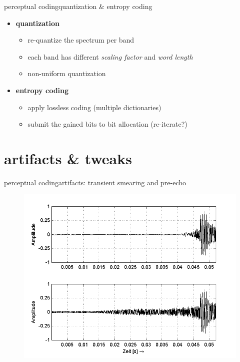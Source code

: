 	\begin{frame}{perceptual coding}{quantization \& entropy coding}
		\begin{itemize}
			\item	\textbf{quantization}
				\begin{itemize}
					\item	re-quantize the spectrum per band
					\item	each band has different \textit{scaling factor} and \textit{word length}
                    \item   non-uniform quantization
				\end{itemize}
			\pause
			\bigskip
            \item	\textbf{entropy coding}
				\begin{itemize}
					\item	apply lossless coding (multiple dictionaries)
					\item	submit the gained bits to bit allocation (re-iterate?)
				\end{itemize}
		\end{itemize}
	\end{frame}

\section[artifacts]{artifacts \& tweaks}	
	\begin{frame}{perceptual coding}{artifacts: transient smearing and pre-echo}
			\begin{figure}
				\centering
					\includegraphics[scale=0.5]{Graph/Lerch16-9}
			\end{figure}
	\end{frame}
	
